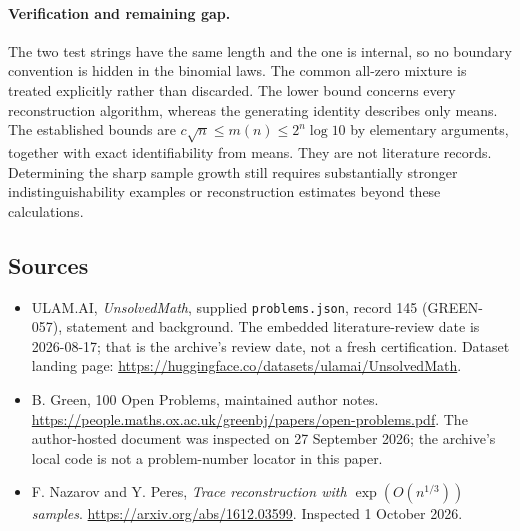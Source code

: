 \documentclass[11pt,a4paper]{article}
\begin{document}
\paragraph{Verification and remaining gap.}
The two test strings have the same length and the one is internal, so no boundary convention is hidden in the binomial laws. The common all-zero mixture is treated explicitly rather than discarded. The lower bound concerns every reconstruction algorithm, whereas the generating identity describes only means. The established bounds are $c\sqrt n\leq m(n)\leq2^n\log10$ by elementary arguments, together with exact identifiability from means. They are not literature records. Determining the sharp sample growth still requires substantially stronger indistinguishability examples or reconstruction estimates beyond these calculations.

\subsection{Sources}

{\small

\begin{itemize}

\item[\hypertarget{source:145:1}{S1}] ULAM.AI, \emph{UnsolvedMath}, supplied \texttt{problems.json}, record 145 (GREEN-057), statement and background. The embedded literature-review date is 2026-08-17; that is the archive’s review date, not a fresh certification. Dataset landing page: \url{https://huggingface.co/datasets/ulamai/UnsolvedMath}.

\item[\hypertarget{source:145:2}{S2}] B. Green, 100 Open Problems, maintained author notes. \url{https://people.maths.ox.ac.uk/greenbj/papers/open-problems.pdf}. The author-hosted document was inspected on 27 September 2026; the archive’s local code is not a problem-number locator in this paper.

\item[E1] F. Nazarov and Y. Peres, \emph{Trace reconstruction with $\exp(O(n^{1/3}))$ samples}. \url{https://arxiv.org/abs/1612.03599}. Inspected 1 October 2026.

\end{itemize}

}

\label{end:145}
\end{document}
